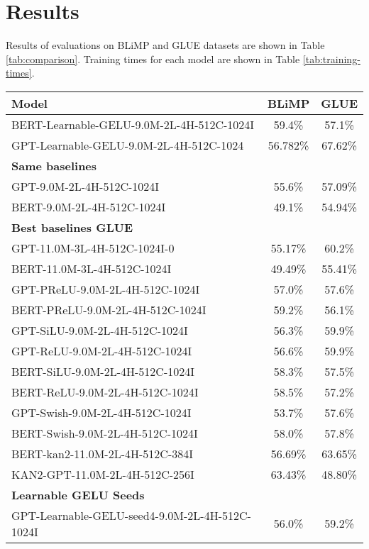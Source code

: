 \section{Results}
Results of evaluations on BLiMP and GLUE datasets are shown in Table \ref{tab:comparison}. Training times for each model are shown in Table \ref{tab:training-times}.
\begin{table*}[h]
    \centering
    \begin{tabular}{lcc}
    \hline
    \textbf{Model} & \textbf{BLiMP} & \textbf{GLUE} \\
    \hline
    BERT-Learnable-GELU-9.0M-2L-4H-512C-1024I & 59.4\% & 57.1\% \\
    GPT-Learnable-GELU-9.0M-2L-4H-512C-1024   & 56.782\% & 67.62\% \\
    \hline
    \multicolumn{3}{l}{\textbf{Same baselines}} \\
    GPT-9.0M-2L-4H-512C-1024I & 55.6\% & 57.09\% \\
    BERT-9.0M-2L-4H-512C-1024I & 49.1\% & 54.94\% \\
    \hline
    \multicolumn{3}{l}{\textbf{Best baselines GLUE}} \\
    GPT-11.0M-3L-4H-512C-1024I-0 & 55.17\% & 60.2\% \\
    BERT-11.0M-3L-4H-512C-1024I & 49.49\% & 55.41\% \\
    \hline
    GPT-PReLU-9.0M-2L-4H-512C-1024I & 57.0\% & 57.6\% \\
    BERT-PReLU-9.0M-2L-4H-512C-1024I & 59.2\% & 56.1\% \\
    GPT-SiLU-9.0M-2L-4H-512C-1024I & 56.3\% & 59.9\% \\
    GPT-ReLU-9.0M-2L-4H-512C-1024I & 56.6\% & 59.9\% \\
    BERT-SiLU-9.0M-2L-4H-512C-1024I & 58.3\% & 57.5\% \\
    BERT-ReLU-9.0M-2L-4H-512C-1024I & 58.5\% & 57.2\% \\
    GPT-Swish-9.0M-2L-4H-512C-1024I & 53.7\% & 57.6\%\\
    BERT-Swish-9.0M-2L-4H-512C-1024I & 58.0\% & 57.8\% \\
    BERT-kan2-11.0M-2L-4H-512C-384I & 56.69\% & 63.65\% \\
    KAN2-GPT-11.0M-2L-4H-512C-256I & 63.43\% & 48.80\% \\
    \hline
    \multicolumn{3}{l}{\textbf{Learnable GELU Seeds}} \\
    GPT-Learnable-GELU-seed4-9.0M-2L-4H-512C-1024I & 56.0\% & 59.2\% \\

\end{tabular}
\end{table*}
